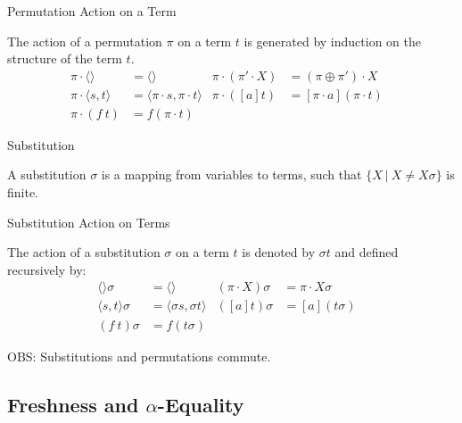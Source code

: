 \begin{frame}{Permutation Action on a Term}
    \begin{definition}
    The action of a permutation $\pi$ on a term $t$ is generated by induction on the structure
    of the term $t$. 
    \begin{align*}
        \pi \cdot  \langle \rangle &= \langle \rangle & 
        \pi \cdot (\pi' \cdot X) &= (\pi \oplus \pi') \cdot X & 
        \\ 
        \pi \cdot \langle s, t \rangle &= \langle \pi \cdot s, \pi \cdot t \rangle  & 
        \pi \cdot ([a]t) &= [\pi \cdot a](\pi \cdot t) & 
        \\
        \pi \cdot (f \ t) &= f(\pi \cdot t) 
    \end{align*}
    \end{definition}
\end{frame}

\begin{frame}{Substitution}
    \begin{definition}[Substitution]
    A substitution $\sigma$ is a mapping from variables to terms, such that
    $\{X \ | \ X \neq X\sigma \}$ is finite.
    \end{definition}
\end{frame}

\begin{frame}{Substitution Action on Terms}
    \begin{definition}    
        The action of a substitution $\sigma$ on a term $t$ is denoted by $\sigma t$ and
        defined recursively by: 
    \begin{align*}
        \langle \rangle \sigma &= \langle \rangle & 
        (\pi \cdot X) \sigma &= \pi \cdot X \sigma  & 
        \\ 
        \langle s, t \rangle \sigma &= \langle \sigma s, \sigma t \rangle  & 
        ([a]t) \sigma &= [a](t \sigma) & 
        \\
        (f \ t) \sigma &= f (t \sigma) 
    \end{align*}
    
    OBS: Substitutions and permutations commute. 
    \end{definition}
\end{frame}

\subsection{Freshness and $\alpha$-Equality}


